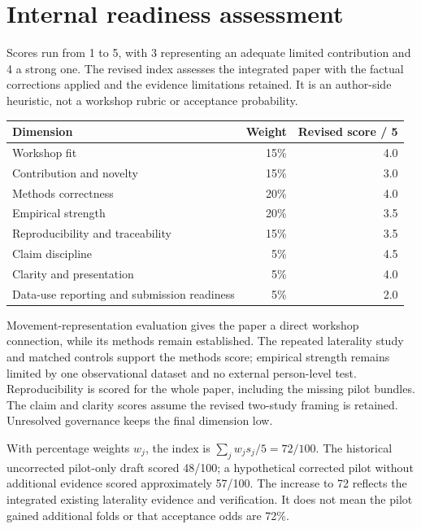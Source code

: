 \documentclass[11pt,letterpaper]{article}
\newcounter{none}
\begin{document}
\section{Internal readiness
assessment}\label{internal-readiness-assessment}

Scores run from 1 to 5, with 3 representing an adequate limited
contribution and 4 a strong one. The revised index assesses the
integrated paper with the factual corrections applied and the evidence
limitations retained. It is an author-side heuristic, not a workshop
rubric or acceptance probability.

{\def\LTcaptype{none} %
\begin{longtable}[]{@{}lrr@{}}
\toprule\noalign{}
Dimension & Weight & Revised score / 5 \\
\midrule\noalign{}
\endhead
\bottomrule\noalign{}
\endlastfoot
Workshop fit & 15\% & 4.0 \\
Contribution and novelty & 15\% & 3.0 \\
Methods correctness & 20\% & 4.0 \\
Empirical strength & 20\% & 3.5 \\
Reproducibility and traceability & 15\% & 3.5 \\
Claim discipline & 5\% & 4.5 \\
Clarity and presentation & 5\% & 4.0 \\
Data-use reporting and submission readiness & 5\% & 2.0 \\
\end{longtable}
}

Movement-representation evaluation gives the paper a direct workshop
connection, while its methods remain established. The repeated
laterality study and matched controls support the methods score;
empirical strength remains limited by one observational dataset and no
external person-level test. Reproducibility is scored for the whole
paper, including the missing pilot bundles. The claim and clarity scores
assume the revised two-study framing is retained. Unresolved governance
keeps the final dimension low.

With percentage weights \(w_j\), the index is
\(\sum_j w_j s_j/5=72/100\). The historical uncorrected pilot-only draft
scored 48/100; a hypothetical corrected pilot without additional
evidence scored approximately 57/100. The increase to 72 reflects the
integrated existing laterality evidence and verification. It does not
mean the pilot gained additional folds or that acceptance odds are 72\%.
\end{document}
